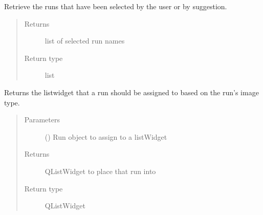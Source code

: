 \documentclass[letterpaper,10pt,english]{sphinxmanual}
\begin{document}
\begin{fulllineitems}

\begin{fulllineitems}
\label{\detokenize{polo.windows:polo.windows.spectrum_dialog.SpectrumDialog.get_selections}}
Retrieve the runs that have been selected by the user or by
suggestion.
\begin{quote}\begin{description}
\item[{Returns}] \leavevmode
list of selected run names

\item[{Return type}] \leavevmode
list

\end{description}\end{quote}

\end{fulllineitems}


\begin{fulllineitems}
\label{\detokenize{polo.windows:polo.windows.spectrum_dialog.SpectrumDialog.get_spectrum_list}}
Returns the listwidget that a run should be assigned to based
on the run’s image type.
\begin{quote}\begin{description}
\item[{Parameters}] \leavevmode
{} ({\hyperref[\detokenize{polo.crystallography:polo.crystallography.run.Run}]{}}) \textendash{} Run object to assign to a listWidget

\item[{Returns}] \leavevmode
QListWidget to place that run into

\item[{Return type}] \leavevmode
QListWidget

\end{description}\end{quote}


\end{fulllineitems}
\end{fulllineitems}
\end{document}
